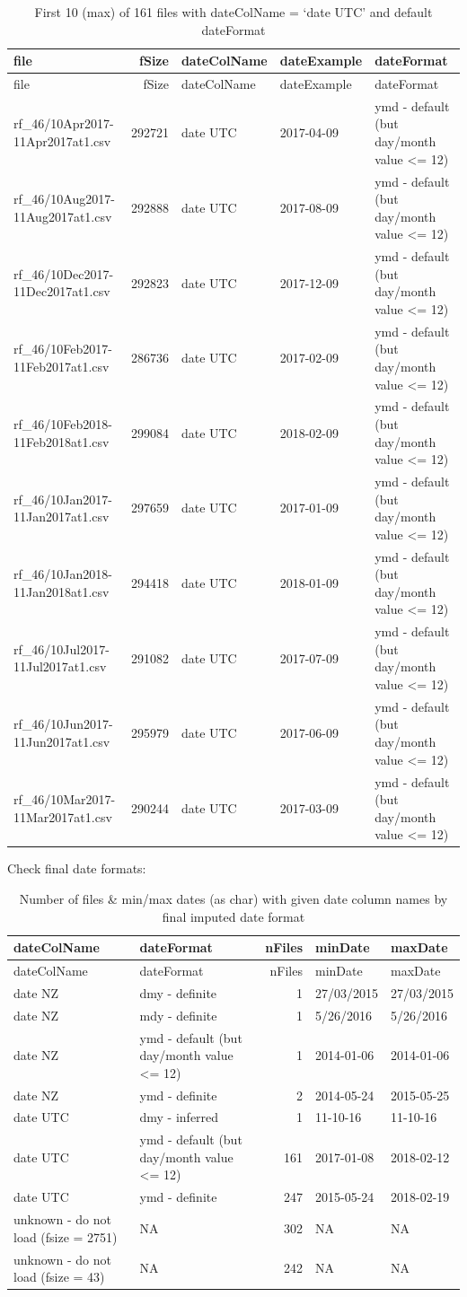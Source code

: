 \documentclass[]{article}
\begin{document}
\begin{longtable}[]{@{}lrlll@{}}
\caption{First 10 (max) of 161 files with dateColName = `date UTC' and
default dateFormat}\tabularnewline
\toprule
file & fSize & dateColName & dateExample & dateFormat\tabularnewline
\midrule
\endfirsthead
\toprule
file & fSize & dateColName & dateExample & dateFormat\tabularnewline
\midrule
\endhead
rf\_46/10Apr2017-11Apr2017at1.csv & 292721 & date UTC & 2017-04-09 & ymd
- default (but day/month value \textless{}= 12)\tabularnewline
rf\_46/10Aug2017-11Aug2017at1.csv & 292888 & date UTC & 2017-08-09 & ymd
- default (but day/month value \textless{}= 12)\tabularnewline
rf\_46/10Dec2017-11Dec2017at1.csv & 292823 & date UTC & 2017-12-09 & ymd
- default (but day/month value \textless{}= 12)\tabularnewline
rf\_46/10Feb2017-11Feb2017at1.csv & 286736 & date UTC & 2017-02-09 & ymd
- default (but day/month value \textless{}= 12)\tabularnewline
rf\_46/10Feb2018-11Feb2018at1.csv & 299084 & date UTC & 2018-02-09 & ymd
- default (but day/month value \textless{}= 12)\tabularnewline
rf\_46/10Jan2017-11Jan2017at1.csv & 297659 & date UTC & 2017-01-09 & ymd
- default (but day/month value \textless{}= 12)\tabularnewline
rf\_46/10Jan2018-11Jan2018at1.csv & 294418 & date UTC & 2018-01-09 & ymd
- default (but day/month value \textless{}= 12)\tabularnewline
rf\_46/10Jul2017-11Jul2017at1.csv & 291082 & date UTC & 2017-07-09 & ymd
- default (but day/month value \textless{}= 12)\tabularnewline
rf\_46/10Jun2017-11Jun2017at1.csv & 295979 & date UTC & 2017-06-09 & ymd
- default (but day/month value \textless{}= 12)\tabularnewline
rf\_46/10Mar2017-11Mar2017at1.csv & 290244 & date UTC & 2017-03-09 & ymd
- default (but day/month value \textless{}= 12)\tabularnewline
\bottomrule
\end{longtable}

Check final date formats:

\begin{longtable}[]{@{}llrll@{}}
\caption{Number of files \& min/max dates (as char) with given date
column names by final imputed date format}\tabularnewline
\toprule
dateColName & dateFormat & nFiles & minDate & maxDate\tabularnewline
\midrule
\endfirsthead
\toprule
dateColName & dateFormat & nFiles & minDate & maxDate\tabularnewline
\midrule
\endhead
date NZ & dmy - definite & 1 & 27/03/2015 & 27/03/2015\tabularnewline
date NZ & mdy - definite & 1 & 5/26/2016 & 5/26/2016\tabularnewline
date NZ & ymd - default (but day/month value \textless{}= 12) & 1 &
2014-01-06 & 2014-01-06\tabularnewline
date NZ & ymd - definite & 2 & 2014-05-24 & 2015-05-25\tabularnewline
date UTC & dmy - inferred & 1 & 11-10-16 & 11-10-16\tabularnewline
date UTC & ymd - default (but day/month value \textless{}= 12) & 161 &
2017-01-08 & 2018-02-12\tabularnewline
date UTC & ymd - definite & 247 & 2015-05-24 & 2018-02-19\tabularnewline
unknown - do not load (fsize = 2751) & NA & 302 & NA & NA\tabularnewline
unknown - do not load (fsize = 43) & NA & 242 & NA & NA\tabularnewline
\bottomrule
\end{longtable}
\end{document}
